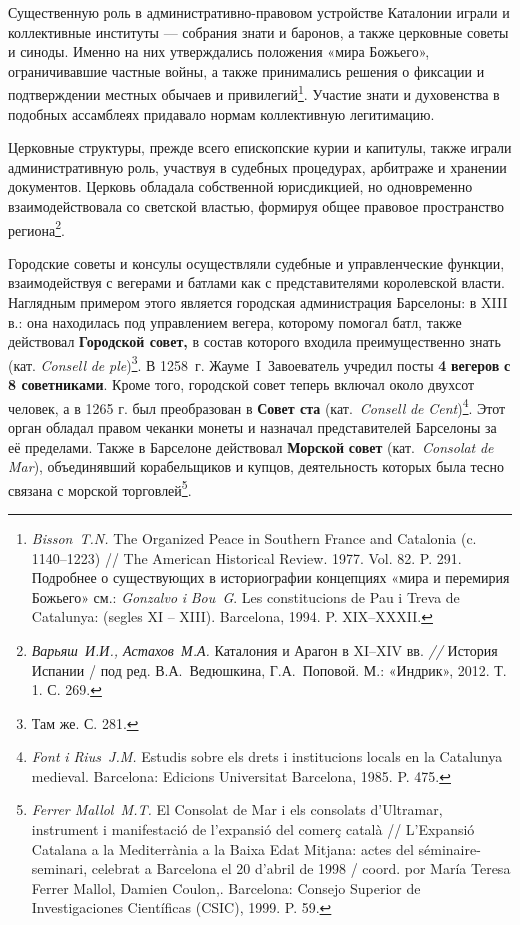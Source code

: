 Существенную роль в административно-правовом устройстве Каталонии играли и коллективные институты --- собрания знати и баронов, а также церковные советы и синоды. Именно на них утверждались положения «мира Божьего», ограничивавшие частные войны, а также принимались решения о фиксации и подтверждении местных обычаев и привилегий\footnote{\emph{Bisson}~\emph{T.}\emph{N}\emph{.} The Organized Peace in Southern France and Catalonia (c. 1140--1223) // The American Historical Review. 1977. Vol. 82. P. 291. Подробнее о существующих в историографии концепциях «мира и перемирия Божьего» см.: \emph{Gonzalvo }\emph{i}\emph{ Bou}\emph{~}\emph{G}. Les constitucions de Pau i Treva de Catalunya: (segles XI -- XIII). Barcelona, 1994. P. XIX--XXXII.}. Участие знати и духовенства в подобных ассамблеях придавало нормам коллективную легитимацию.

Церковные структуры, прежде всего епископские курии и капитулы, также играли административную роль, участвуя в судебных процедурах, арбитраже и хранении документов. Церковь обладала собственной юрисдикцией, но одновременно взаимодействовала со светской властью, формируя общее правовое пространство региона\footnote{\emph{Варьяш}\emph{~И.И., Астахов~М.А.} Каталония и Арагон в XI--XIV вв. \emph{// }История Испании / под ред. В.А.~Ведюшкина, Г.А.~Поповой. М.: «Индрик», 2012. Т. 1. С. 269.}.

Городские советы и консулы осуществляли судебные и управленческие функции, взаимодействуя с вегерами и батлами как с представителями королевской власти. Наглядным примером этого является городская администрация Барселоны: в XIII в.: она находилась под управлением вегера, которому помогал батл, также действовал \textbf{Г}\textbf{ородской совет,} в состав которого входила преимущественно знать (кат. \emph{Consell}\emph{ de }\emph{ple})\footnote{Там же. С. 281.}. В 1258~г. Жауме~I~Завоеватель учредил посты \textbf{4}\textbf{ }\textbf{вегеров}\textbf{ с 8 советниками}. Кроме того, городской совет теперь включал около двухсот человек, а в 1265 г. был преобразован в \textbf{Совет ста} (кат.~\emph{Consell}\emph{ de }\emph{Cent})\footnote{\emph{Font }\emph{i Rius}\emph{~}\emph{J.M.} Estudis sobre els drets i institucions locals en la Catalunya medieval. Barcelona: Edicions Universitat Barcelona, 1985. P. 475.}. Этот орган обладал правом чеканки монеты и назначал представителей Барселоны за её пределами. Также в Барселоне действовал \textbf{Морско}\textbf{й}\textbf{ совет} (кат.~\emph{Consolat}\emph{ de }\emph{Mar}), объединявший корабельщиков и купцов, деятельность которых была тесно связана с морской торговлей\footnote{\emph{Ferrer Mallol}\emph{~}\emph{M.T. }El Consolat de Mar i els consolats d’Ultramar, instrument i manifestació de l’expansió del comerç català // L'Expansió Catalana a la Mediterrània a la Baixa Edat Mitjana: actes del séminaire-seminari, celebrat a Barcelona el 20 d'abril de 1998 / coord. por María Teresa Ferrer Mallol, Damien Coulon,. Barcelona: Consejo Superior de Investigaciones Científicas (CSIC), 1999. P. 59.}.


